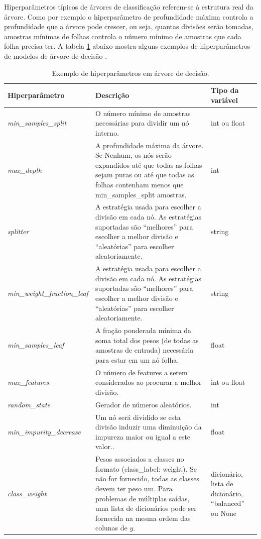 Hiperparâmetros típicos de árvores de classificação referem-se à estrutura real da árvore. Como por exemplo o hiperparâmetro de profundidade máxima controla a profundidade que a árvore pode crescer, ou seja, quantas divisões serão
tomadas, amostras mínimas de folhas controla o número mínimo de amostras que cada folha precisa ter. A tabela \ref{tabela:ex:hiper} abaixo mostra alguns exemplos de hiperparâmetros de modelos de árvore de decisão \cite{tree:tunning} \cite{ian}.
\begin{table}[htb]
\centering
\caption{Exemplo de hiperparâmetros em árvore de decisão\cite{tuning:artigo}\cite{ian}.}
\label{tabela:ex:hiper}
\begin{tabular}{|p{4cm}|p{8cm}|p{3cm}|} 
 \hline
\textbf{Hiperparâmetro} & \textbf{Descrição} & \textbf{Tipo da variável} \\
  \hline
  \textit{min\_samples\_split} & O número mínimo de amostras necessárias para dividir um nó interno. & int ou float \\
  \hline
  \textit{max\_depth} & A profundidade máxima da árvore. Se Nenhum, os nós serão expandidos até que todas as folhas sejam puras ou até que todas as folhas contenham menos que min\_samples\_split amostras. & int \\
  \hline
  \textit{splitter} & A estratégia usada para escolher a divisão em cada nó. As estratégias suportadas são “melhores” para escolher a melhor divisão e “aleatórias” para escolher aleatoriamente. & string \\
  \hline
  \textit{min\_weight\_fraction\_leaf} & A estratégia usada para escolher a divisão em cada nó. As estratégias suportadas são “melhores” para escolher a melhor divisão e “aleatórias” para escolher aleatoriamente. & string \\
  \hline
  \textit{min\_samples\_leaf} & A fração ponderada mínima da soma total dos pesos (de todas as amostras de entrada) necessária para estar em um nó folha. & float \\
  \hline
  \textit{max\_features} & O número de features a serem considerados ao procurar a melhor divisão. & int ou float \\
  \hline
  \textit{random\_state} & Gerador de números aleatórios. & int \\
  \hline
  \textit{min\_impurity\_decrease} & Um nó será dividido se esta divisão induzir uma diminuição da impureza maior ou igual a este valor.. & float \\
  \hline
  \textit{class\_weight} & Pesos associados a classes no formato (class\_label: weight). Se não for fornecido, todas as classes devem ter peso um. Para problemas de múltiplas saídas, uma lista de dicionários pode ser fornecida na mesma ordem das colunas de $y$. & dicionário, lista de dicionário, “balanced” ou None\\
  \hline
\end{tabular}
\end{table}
